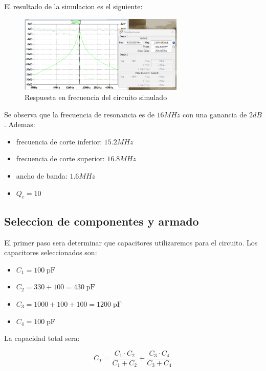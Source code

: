 El resultado de la simulacion es el siguiente:

\begin{figure}[h]
    \centering
    \includegraphics[width=0.7\textwidth]{Imagenes/resultado_circuito.png}
    \caption{Respuesta en frecuencia del circuito simulado}
\end{figure}

Se observa que la frecuencia de resonancia es de $16 MHz$ con una ganancia de $2 dB$. Ademas:

\begin{itemize}
    \item frecuencia de corte inferior: $15.2 MHz$
    \item frecuencia de corte superior: $16.8 MHz$
    \item ancho de banda: $1.6 MHz$
    \item $Q_c = 10$
\end{itemize}

\newpage
\subsection{Seleccion de componentes y armado}

El primer paso sera determinar que capacitores utilizaremos para el circuito. Los capacitores seleccionados son:

\begin{itemize}
    \item $C_1 = 100\; \text{pF}$
    \item $C_2 = 330 + 100 = 430\; \text{pF}$
    \item $C_3 = 1000 + 100 + 100 =1200\; \text{pF}$
    \item $C_4 = 100\; \text{pF}$
\end{itemize}

La capacidad total sera:

\begin{equation}
    C_T = \frac{C_1 \cdot C_2}{C_1 + C_2} + \frac{C_3 \cdot C_4}{C_3 + C_4} 
\end{equation}

